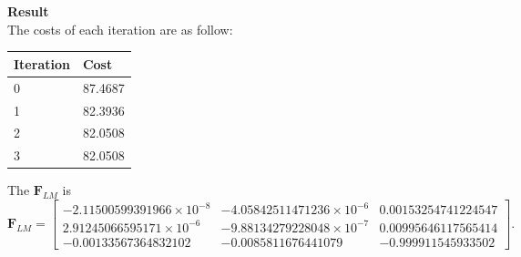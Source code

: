 \documentclass{../../assignment}
\begin{document}
\begin{problemlist}
\begin{enumerate}
\\\\
\textbf{Result}\\
The costs of each iteration are as follow:
\begin{center}  
\begin{tabular}{|l|l|}
\hline
Iteration&Cost\\
\hline
0&87.4687\\
\hline 
1&82.3936\\
\hline 
2&82.0508\\
\hline
3&82.0508\\
\hline  
\end{tabular}
\end{center}
The $\mathbf{F}_{LM}$ is
\[
\mathbf{F}_{LM} = 
\begin{bmatrix}
-2.11500599391966\times 10^{-8} & -4.05842511471236\times 10^{-6} & 0.00153254741224547\\
2.91245066595171\times 10^{-6} & -9.88134279228048\times 10^{-7} & 0.00995646117565414\\
-0.00133567364832102 & -0.0085811676441079 & -0.999911545933502
\end{bmatrix}.
\]


\end{enumerate}
\end{problemlist}
\end{document}

